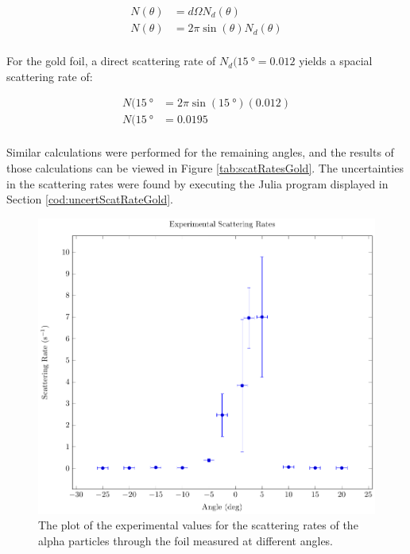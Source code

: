 \documentclass[a4paper]{article}
\begin{document}
\begin{align*}
  N (\theta) &= d\Omega N_d (\theta) \\
  N (\theta) &= 2 \pi \sin{(\theta)} N_d (\theta) \\
\end{align*} 

\qq For the gold foil, a direct scattering rate of \( N_d (\SI{15}{\degree} =
\num{0.012} \) yields a spacial scattering rate of:

\begin{align*}
  N (\SI{15}{\degree} &= 2 \pi \sin{(\SI{15}{\degree})} (\num{0.012}) \\
  N (\SI{15}{\degree} &= \num{0.0195} \\
\end{align*}

Similar calculations were performed for the remaining angles, and the results of
those calculations can be viewed in Figure \ref{tab:scatRatesGold}. The
uncertainties in the scattering rates were found by executing the Julia program
displayed in Section \ref{cod:uncertScatRateGold}.

\begin{figure}[H]
  \begin{center}
    \includegraphics[scale=0.8]{Plots/ExperimentalScatteringRates/expScatRates.pdf}
  \end{center}
  \caption{The plot of the experimental values for the scattering rates of the
    alpha particles through the foil measured at different angles.}
  \label{gph:scatRatesGold}
\end{figure}
\end{document}
